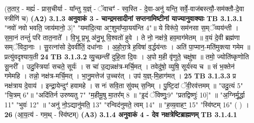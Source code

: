 \documentclass[17pt]{extarticle}
\begin{document}
                  \newline
                                    (त॒तार॒ - मह्यं॑ - प्रास॒चीर्या - या᳚न्तु य॒ज्ञ्ं - ॅवाचꣳ॑ - स्व॒स्ति - दे॒वा-अनु॑ यन्ति॒ सर्वे॒-वाज॑बस्त्यौ॒-सम॑क्तौ-दे॒वा स्त्रीणि॑ च) \textbf{(A2)} \newline \newline
                \textbf{ 3.1.3     अनुवाकं   3 - चान्द्रमसादीनां सप्तनामिष्टीनां याज्यानुवाक्याः} \newline
                                \textbf{ TB 3.1.3.1} \newline
                  "नवो॑ नवो भवति॒ जाय॑मानो॒ {3]" "यमा॑दि॒त्या अꣳ॒॒शुमा᳚प्या॒यय॑न्ति {4}"॥ ये विरू॑पे॒ सम॑नसा स॒म्ॅव्यय॑न्ती । स॒मा॒नं तन्तुं॑ परि तात॒नाते᳚ । वि॒भू प्र॒भू अ॑नु॒भू वि॒श्वतो॑ हुवे । ते नो॒ नक्ष॑त्रे॒ हव॒माग॑मेतम् ॥ व॒यं दे॒वी ब्रह्म॑णा सम्ॅविदा॒नाः । सु॒रत्ना॑सो दे॒ववी॑तिं॒ दधा॑नाः । अ॒हो॒रा॒त्रे ह॒विषा॑ व॒र्द्धय॑न्तः । अति॑ पा॒प्मान॒-मति॑मुक्त्या गमेम ॥ प्रत्यु॑वदृश्याय॒ती \textbf{ 24} \newline
                  \newline
                                \textbf{ TB 3.1.3.2} \newline
                  व्यु॒च्छन्ती॑ दुहि॒ता दि॒वः । अ॒पो म॒ही वृ॑णुते॒ चक्षु॑षा ॥ तमो॒ ज्योति॑ष्कृणोति सू॒नरी᳚ । उदु॒स्त्रियाः᳚ सचते॒ सूर्यः॑ । स चा॑ उ॒द्यन्नक्ष॑त्र-मर्चि॒मत् । तवेदु॑षो॒ व्युषि॒ सूर्य॑स्य च ॥ सं भ॒क्तेन॑ गमेमहि । तन्नो॒ नक्ष॑त्र-मर्चि॒मत् । भा॒नु॒मत्तेज॑ उ॒च्चर॑त् । उप॑ य॒ज्ञ्-मि॒हाग॑मत् । \textbf{ 25} \newline
                  \newline
                                \textbf{ TB 3.1.3.3} \newline
                  प्र नक्ष॑त्राय दे॒वाय॑ । इन्द्रा॒येन्दुꣳ॑ हवामहे । स नः॑ सवि॒ता सु॑वथ् स॒निम् । पु॒ष्टि॒दां ॅवी॒रव॑त्तमम् ॥ "उदु॒त्यं {5}" "चि॒त्रम् {6}"॥ "अदि॑तिर्न उरुष्यतु {7}" "म॒हीमू॒षु मा॒तर᳚म् {8} ॥ "इ॒दं ॅविष्णुः॒{9}" "प्रतद्विष्णुः॑ {10]" ॥ "अ॒ग्निर्मू॒र्द्धा {11}" "भुवः॑ {12}" ॥ "अनु॑ नो॒ऽद्यानु॑मति॒ {13}" "रन्विद॑नुमते॒ त्वम् {14}" ॥ "ह॒व्य॒वाहꣳ॒॒ {15}" "स्वि॑ष्टम् {16}" ( ) । \textbf{ 26} \newline
                  \newline
                                    (आ॒य॒त्य॑ - गम॒थ् - स्वि॑ष्टम्) \textbf{(A3)} \newline \newline
                \textbf{ 3.1.4     अनुवाकं   4 - देव नक्षत्रेष्टिब्राह्मणम्} \newline
                                \textbf{ TB 3.1.4.1} \newline
}}
\end{document}
